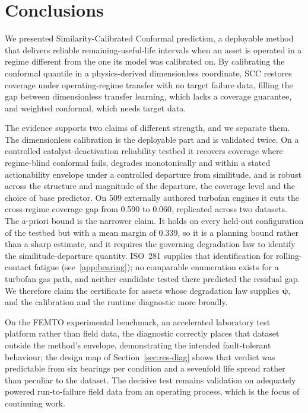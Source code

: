 \section{Conclusions}\label{sec:conclusions}
We presented Similarity-Calibrated Conformal prediction, a deployable method that delivers reliable
remaining-useful-life intervals when an asset is operated in a regime different from the one its model
was calibrated on. By calibrating the conformal quantile in a physics-derived dimensionless
coordinate, SCC restores coverage under operating-regime transfer with no target failure data,
filling the gap between dimensionless transfer learning, which lacks a coverage guarantee, and
weighted conformal, which needs target data.

The evidence supports two claims of different strength, and we separate them. The dimensionless
calibration is the deployable part and is validated twice. On a controlled catalyst-deactivation
reliability testbed it recovers coverage where regime-blind conformal fails, degrades monotonically
and within a stated actionability envelope under a controlled departure from similitude, and is
robust across the structure and magnitude of the departure, the coverage level and the choice of
base predictor. On 509 externally authored turbofan engines it cuts the cross-regime coverage gap
from 0.590 to 0.060, replicated across two datasets. The a-priori bound is the narrower claim. It
holds on every held-out configuration of the testbed but with a mean margin of 0.339, so it is a
planning bound rather than a sharp estimate, and it requires the governing degradation law to
identify the similitude-departure quantity. ISO~281 supplies that identification for rolling-contact
fatigue (see~\ref{app:bearing}); no comparable enumeration exists for a turbofan gas path, and
neither candidate tested there predicted the residual gap. We therefore claim the certificate for
assets whose degradation law supplies $\boldsymbol\psi$, and the calibration and the runtime
diagnostic more broadly.

On the FEMTO experimental benchmark, an accelerated laboratory test platform rather than field data,
the diagnostic correctly places that dataset outside the method's envelope, demonstrating the
intended fault-tolerant behaviour; the design map of Section~\ref{sec:res-diag} shows that verdict
was predictable from six bearings per condition and a sevenfold life spread rather than peculiar to
the dataset. The decisive test remains validation on adequately powered run-to-failure field data
from an operating process, which is the focus of continuing work.
